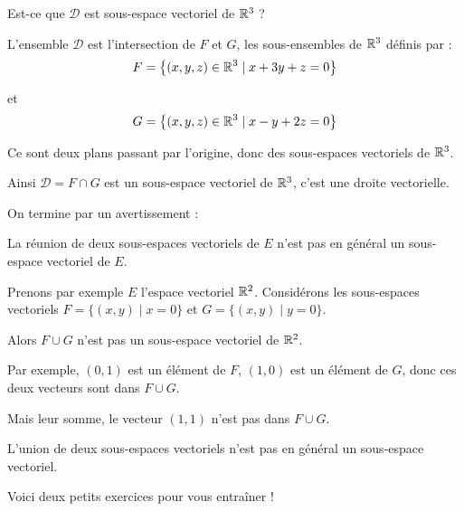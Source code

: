 Est-ce que $\mathcal{D}$ est sous-espace vectoriel de $\mathbb{R}^3$ ?

\change


L'ensemble $\mathcal{D}$ est l'intersection de $F$ et $G$, 
les sous-ensembles de $\mathbb{R}^3$ définis par :
$$F=\big\{ (x,y,z) \in \mathbb{R}^3\mid x+3y+z =0 \big\}$$

\change

et $$G=\big\{ (x,y,z) \in \mathbb{R}^3 \mid x-y+2z =0 \big\}$$


\change


Ce sont deux plans passant par l'origine, donc des sous-espaces vectoriels de $\mathbb{R}^3$.

\change

Ainsi $\mathcal{D} =F \cap G$ est un sous-espace vectoriel de $\mathbb{R}^3$, c'est une droite vectorielle.

 
\diapo

On termine par un avertissement : 

La réunion de deux sous-espaces vectoriels de $E$ n'est pas en général 
un sous-espace vectoriel de $E$.

\change

Prenons par exemple $E$ l'espace vectoriel $\mathbb{R}^2$. Considérons les sous-espaces vectoriels
$F=\big\{(x,y)\mid x=0\big\}$ et $G=\big\{(x,y)\mid y=0\big\}$.

Alors $F\cup G$ n'est pas un sous-espace vectoriel de $\mathbb{R}^2$.

\change

Par exemple, $(0,1)$ est un élément de $F$,
$(1,0)$ est un élément de $G$, donc ces deux vecteurs sont dans $F\cup G$.

\change

Mais leur somme, le vecteur $(1,1)$  n'est pas dans $F\cup G$.

\change

L'union de deux sous-espaces vectoriels n'est pas en général 
un sous-espace vectoriel.



\diapo

Voici deux petits exercices pour vous entraîner !


